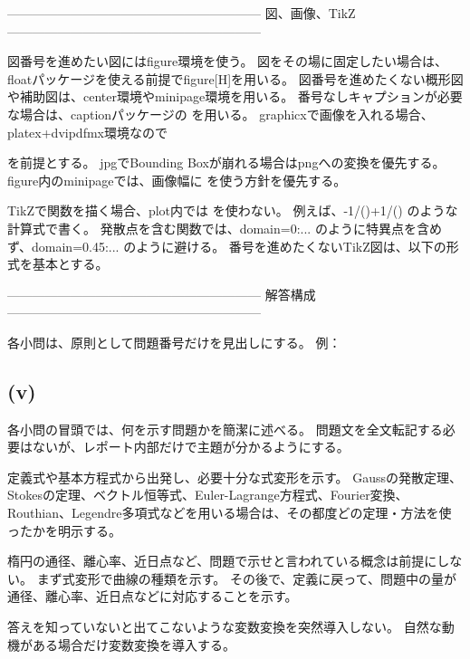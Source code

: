 ------------------------------------------------------------
図、画像、TikZ
------------------------------------------------------------

図番号を進めたい図にはfigure環境を使う。
図をその場に固定したい場合は、floatパッケージを使える前提でfigure[H]を用いる。
図番号を進めたくない概形図や補助図は、center環境やminipage環境を用いる。
番号なしキャプションが必要な場合は、captionパッケージの  を用いる。
graphicxで画像を入れる場合、platex+dvipdfmx環境なので \usepackage[dvipdfmx]{graphicx} を前提とする。
jpgでBounding Boxが崩れる場合はpngへの変換を優先する。
figure内のminipageでは、画像幅に \linewidth を使う方針を優先する。

TikZで関数を描く場合、plot内では \frac を使わない。
例えば、-1/(\x)+1/(\x*\x) のような計算式で書く。
発散点を含む関数では、domain=0:... のように特異点を含めず、domain=0.45:... のように避ける。
番号を進めたくないTikZ図は、以下の形式を基本とする。

\begin{center}
  \begin{minipage}{0.75\textwidth}
    \centering
  \end{minipage}
\end{center}

------------------------------------------------------------
解答構成
------------------------------------------------------------

各小問は、原則として問題番号だけを見出しにする。
例：
\subsection*{(v)}

各小問の冒頭では、何を示す問題かを簡潔に述べる。
問題文を全文転記する必要はないが、レポート内部だけで主題が分かるようにする。

定義式や基本方程式から出発し、必要十分な式変形を示す。
Gaussの発散定理、Stokesの定理、ベクトル恒等式、Euler-Lagrange方程式、Fourier変換、Routhian、Legendre多項式などを用いる場合は、その都度どの定理・方法を使ったかを明示する。

楕円の通径、離心率、近日点など、問題で示せと言われている概念は前提にしない。
まず式変形で曲線の種類を示す。
その後で、定義に戻って、問題中の量が通径、離心率、近日点などに対応することを示す。

答えを知っていないと出てこないような変数変換を突然導入しない。
自然な動機がある場合だけ変数変換を導入する。

